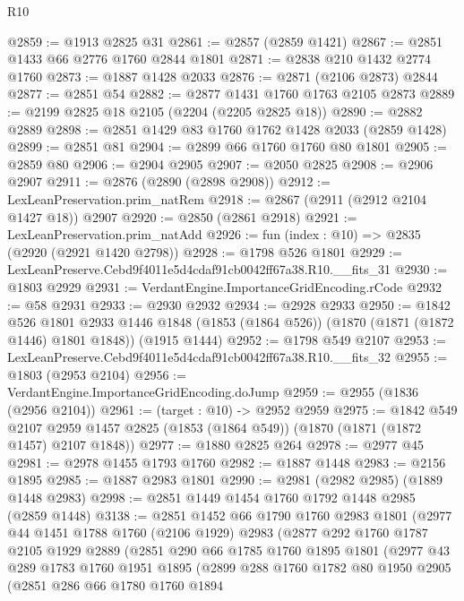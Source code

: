 \begin{lexlean}{R10}
\begin{coremodule}
@2859 := @1913 @2825 @31
@2861 := @2857 (@2859 @1421)
@2867 := @2851 @1433 @66 @2776 @1760 @2844 @1801
@2871 := @2838 @210 @1432 @2774 @1760
@2873 := @1887 @1428 @2033
@2876 := @2871 (@2106 @2873) @2844
@2877 := @2851 @54
@2882 := @2877 @1431 @1760 @1763 @2105 @2873
@2889 := @2199 @2825 @18 @2105 (@2204 (@2205 @2825 @18))
@2890 := @2882 @2889
@2898 := @2851 @1429 @83 @1760 @1762 @1428 @2033 (@2859 @1428)
@2899 := @2851 @81
@2904 := @2899 @66 @1760 @1760 @80 @1801
@2905 := @2859 @80
@2906 := @2904 @2905
@2907 := @2050 @2825
@2908 := @2906 @2907
@2911 := @2876 (@2890 (@2898 @2908))
@2912 := LexLeanPreservation.prim_natRem
@2918 := @2867 (@2911 (@2912 @2104 @1427 @18)) @2907
@2920 := @2850 (@2861 @2918)
@2921 := LexLeanPreservation.prim_natAdd
@2926 := fun (index : @10) => @2835 (@2920 (@2921 @1420 @2798))
@2928 := @1798 @526 @1801
@2929 := LexLeanPreserve.Cebd9f4011e5d4cdaf91cb0042ff67a38.R10.__fits_31
@2930 := @1803 @2929
@2931 := VerdantEngine.ImportanceGridEncoding.rCode
@2932 := @58 @2931
@2933 := @2930 @2932
@2934 := @2928 @2933
@2950 := @1842
    @526
    @1801
    @2933
    @1446
    @1848
    (@1853 (@1864 @526))
    (@1870 (@1871 (@1872 @1446) @1801 @1848))
    (@1915 @1444)
@2952 := @1798 @549 @2107
@2953 := LexLeanPreserve.Cebd9f4011e5d4cdaf91cb0042ff67a38.R10.__fits_32
@2955 := @1803 (@2953 @2104)
@2956 := VerdantEngine.ImportanceGridEncoding.doJump
@2959 := @2955 (@1836 (@2956 @2104))
@2961 := (target : @10) -> @2952 @2959
@2975 := @1842
    @549
    @2107
    @2959
    @1457
    @2825
    (@1853 (@1864 @549))
    (@1870 (@1871 (@1872 @1457) @2107 @1848))
@2977 := @1880 @2825 @264
@2978 := @2977 @45
@2981 := @2978 @1455 @1793 @1760
@2982 := @1887 @1448
@2983 := @2156 @1895
@2985 := @1887 @2983 @1801
@2990 := @2981 (@2982 @2985) (@1889 @1448 @2983)
@2998 := @2851 @1449 @1454 @1760 @1792 @1448 @2985 (@2859 @1448)
@3138 := @2851
    @1452
    @66
    @1790
    @1760
    @2983
    @1801
    (@2977
      @44
      @1451
      @1788
      @1760
      (@2106 @1929)
      @2983
      (@2877
        @292
        @1760
        @1787
        @2105
        @1929
        @2889
        (@2851
          @290
          @66
          @1785
          @1760
          @1895
          @1801
          (@2977
            @43
            @289
            @1783
            @1760
            @1951
            @1895
            (@2899
              @288
              @1760
              @1782
              @80
              @1950
              @2905
              (@2851
                @286
                @66
                @1780
                @1760
                @1894

\end{coremodule}
\end{lexlean}

